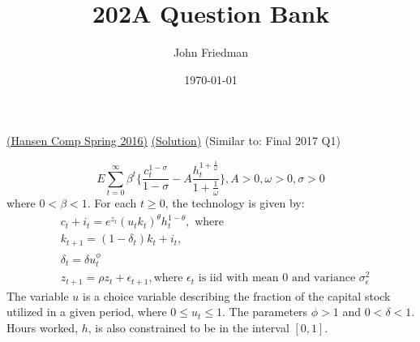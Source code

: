 \documentclass[answers]{exam}
\title{202A Question Bank}
\author{John Friedman}
\date{\today}
\begin{document}
\maketitle

\begin{questions}

    \question \href{https://economics.ucla.edu/wp-content/uploads/2016/10/macro-f16.pdf}{(Hansen Comp Spring 2016)}
    \href{https://drive.google.com/file/u/3/d/1I_XVSpJZWsAtp4uIZizpPaIZk6EHggCC/view?usp=drive_open}{(Solution)}
    (Similar to: Final 2017 Q1)

    $$E \sum_{t=0}^{\infty} \beta^t \{\frac{c_t^{1-\sigma}}{1-\sigma} - A \frac{h_t^{1+\frac{1}{\omega}}}{1+ \frac{1}{\omega}}\}, A> 0, \omega > 0, \sigma > 0$$
    where $0 < \beta < 1$. For each $t \geq 0$, the technology is given by:
    \begin{align*}
        &c_t + i_t = e^{z_t} (u_t k_t)^{\theta} h_t^{1-\theta}, \text{ where}\\
        &k_{t+1} = (1-\delta_t) k_t + i_t,\\
        &\delta_t = \delta u_t^\phi\\
        &z_{t+1} = \rho z_t + \epsilon_{t+1}, \text{where $\epsilon_{t}$ is iid with mean 0 and variance $\sigma_{\epsilon}^2$}
    \end{align*}
    The variable $u$ is a choice variable describing the fraction of the capital stock utilized in a given period, where $0 \leq u_t \leq 1$. The parameters $\phi > 1$ and $0 < \delta < 1$. Hours worked, $h$, is also constrained to be in the interval $[0,1]$.
\end{questions}
\end{document}
